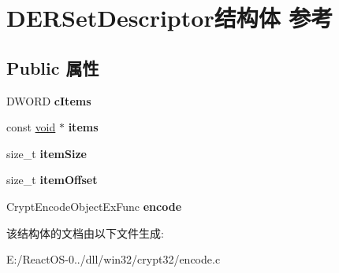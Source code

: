 \hypertarget{struct_d_e_r_set_descriptor}{}\section{D\+E\+R\+Set\+Descriptor结构体 参考}
\label{struct_d_e_r_set_descriptor}
\subsection*{Public 属性}
\begin{DoxyCompactItemize}
\item 
\mbox{\label{struct_d_e_r_set_descriptor_af8c90c31ebeebfea91bd2853edd7167e}} 
D\+W\+O\+RD {\bfseries c\+Items}
\item 
\mbox{\label{struct_d_e_r_set_descriptor_af3ab945f97ae83d0010382c29fffcf45}} 
const \hyperlink{interfacevoid}{void} $\ast$ {\bfseries items}
\item 
\mbox{\label{struct_d_e_r_set_descriptor_a756483bd7b5746a096194dfb33ddafe5}} 
size\+\_\+t {\bfseries item\+Size}
\item 
\mbox{\label{struct_d_e_r_set_descriptor_a115ba63a9cbfa9ec72839bba3483a3e4}} 
size\+\_\+t {\bfseries item\+Offset}
\item 
\mbox{\label{struct_d_e_r_set_descriptor_a44cf046ad1afa20cb0eb9350bbda7530}} 
Crypt\+Encode\+Object\+Ex\+Func {\bfseries encode}
\end{DoxyCompactItemize}


该结构体的文档由以下文件生成\+:\begin{DoxyCompactItemize}
\item 
E\+:/\+React\+O\+S-\/0../dll/win32/crypt32/encode.\+c\end{DoxyCompactItemize}
